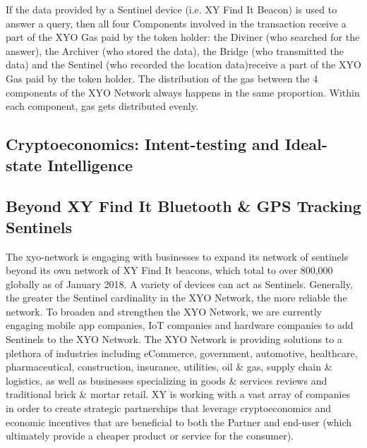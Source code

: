 \documentclass{article}
\begin{document}
If the data provided by a Sentinel device (i.e. XY Find It Beacon) is used to answer a query, then all four Components involved in the transaction receive a part of the XYO Gas paid by the token holder: the Diviner (who searched for the answer), the Archiver (who stored the data), the Bridge (who transmitted the data) and the Sentinel (who recorded the location data)receive a part of the XYO Gas paid by the token holder. The distribution of the gas between the 4 components of the XYO Network always happens in the same proportion.  Within each component, gas gets distributed evenly.

\subsection {Cryptoeconomics: Intent-testing and Ideal-state Intelligence}

\subsection {Beyond XY Find It Bluetooth \& GPS Tracking Sentinels}
The \Gls{xyo-network} is engaging with businesses to expand its network of \Glspl{sentinel} beyond its own network of XY Find It beacons, which total to over 800,000 globally as of January 2018. A variety of devices can act as Sentinels. Generally, the greater the Sentinel cardinality in the XYO Network, the more reliable the network. To broaden and strengthen the XYO Network, we are currently engaging mobile app companies, IoT companies and hardware companies to add Sentinels to the XYO Network. The XYO Network is providing solutions to a plethora of industries including eCommerce, government, automotive, healthcare, pharmaceutical, construction, insurance, utilities, oil \& gas, supply chain \& logistics, as well as businesses specializing in goods \& services reviews and traditional brick \& mortar retail. XY is working with a vast array of companies in order to create strategic partnerships that leverage \gls{cryptoeconomics} and economic incentives that are beneficial to both the Partner and end-user (which ultimately provide a cheaper product or service for the consumer).
\end{document}
